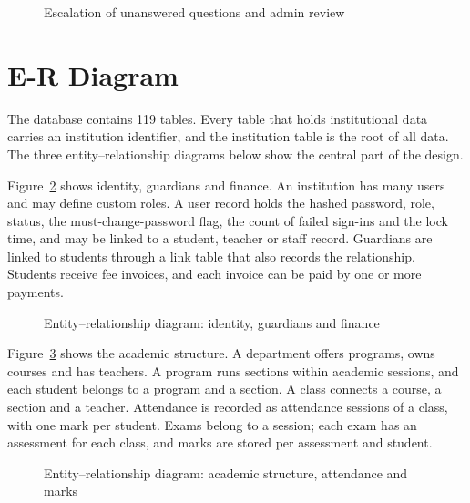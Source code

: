 {
  \begin{figure}[!htbp]
    \centering
    \caption{Escalation of unanswered questions and admin review}
    \label{fig:escalation}
  \end{figure}
}

\section{E-R Diagram}
The database contains 119 tables. Every table that holds institutional data carries an institution identifier, and the institution table is the root of all data. The three entity--relationship diagrams below show the central part of the design.

Figure~\ref{fig:erd-identity} shows identity, guardians and finance. An institution has many users and may define custom roles. A user record holds the hashed password, role, status, the must-change-password flag, the count of failed sign-ins and the lock time, and may be linked to a student, teacher or staff record. Guardians are linked to students through a link table that also records the relationship. Students receive fee invoices, and each invoice can be paid by one or more payments.

{
  \begin{figure}[!htbp]
    \centering
    \caption{Entity--relationship diagram: identity, guardians and finance}
    \label{fig:erd-identity}
  \end{figure}
}

Figure~\ref{fig:erd-academics} shows the academic structure. A department offers programs, owns courses and has teachers. A program runs sections within academic sessions, and each student belongs to a program and a section. A class connects a course, a section and a teacher. Attendance is recorded as attendance sessions of a class, with one mark per student. Exams belong to a session; each exam has an assessment for each class, and marks are stored per assessment and student.

{
  \begin{figure}[!htbp]
    \centering
    \caption{Entity--relationship diagram: academic structure, attendance and marks}
    \label{fig:erd-academics}
  \end{figure}
}

